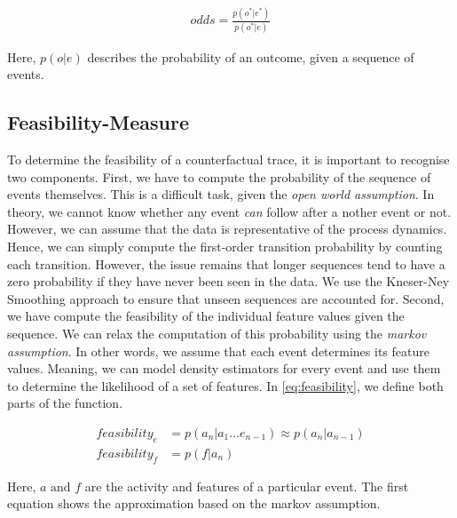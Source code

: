 \documentclass[./../../paper.tex]{subfiles}
\begin{document}
\begin{align}
    \label{eq:likelihood}
    odds = \frac{p(o^*|e^*)}{p(o^*|e)}
\end{align}

Here, $p(o|e)$ describes the probability of an outcome, given a sequence of events.

\subsection{Feasibility-Measure}
To determine the feasibility of a counterfactual trace, it is important to recognise two components. First, we have to compute the probability of the sequence of events themselves. This is a difficult task, given the \emph{open world assumption}. In theory, we cannot know whether any event \emph{can} follow after a nother event or not. However, we can assume that the data is representative of the process dynamics. Hence, we can simply compute the first-order transition probability by counting each transition. However, the issue remains that longer sequences tend to have a zero probability if they have never been seen in the data. We use the Kneser-Ney Smoothing\needscite{} approach to ensure that unseen sequences are accounted for. Second, we have compute the feasibility of the individual feature values given the sequence. We can relax the computation of this probability using the \emph{markov assumption}. In other words, we assume that each event determines its feature values. Meaning, we can model density estimators for every event and use them to determine the likelihood of a set of features. In \autoref{eq:feasibility}, we define both parts of the function.

\begin{align}
    \label{eq:feasibility}
    feasibility_e & =p(a_n|a_1\ldots e_{n-1}) \approx  p(a_n|a_{n-1}) \\
    feasibility_f & =p(f|a_n)
\end{align}

\noindent Here, $a \text{ and } f$ are the activity and features of a particular event. The first equation shows the approximation based on the markov assumption.
\end{document}
